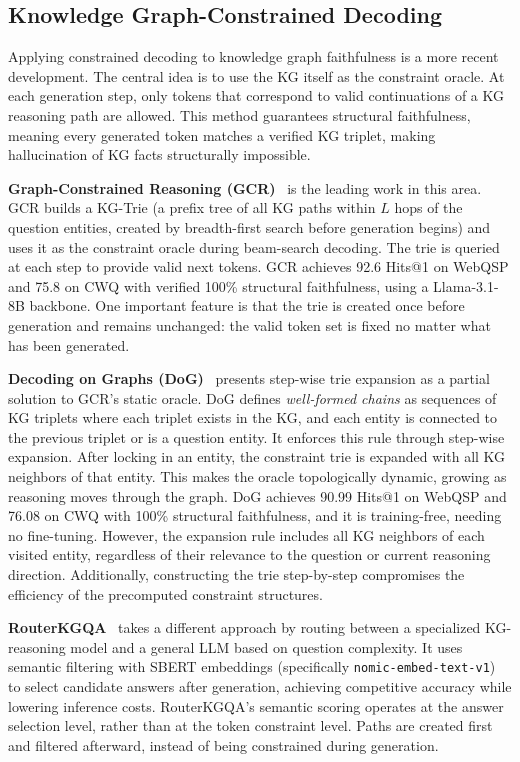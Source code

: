 \subsection{Knowledge Graph-Constrained Decoding}

Applying constrained decoding to knowledge graph faithfulness is a more recent development. The central idea is to use the KG itself as the constraint oracle. At each generation step, only tokens that correspond to valid continuations of a KG reasoning path are allowed. This method guarantees structural faithfulness, meaning every generated token matches a verified KG triplet, making hallucination of KG facts structurally impossible.

\textbf{Graph-Constrained Reasoning (GCR)}~\citep{luo2025-graph-constrained-reasoning} is the leading work in this area. GCR builds a KG-Trie (a prefix tree of all KG paths within $L$ hops of the question entities, created by breadth-first search before generation begins) and uses it as the constraint oracle during beam-search decoding. The trie is queried at each step to provide valid next tokens. GCR achieves 92.6 Hits@1 on WebQSP and 75.8 on CWQ with verified 100\% structural faithfulness, using a Llama-3.1-8B backbone. One important feature is that the trie is created once before generation and remains unchanged: the valid token set is fixed no matter what has been generated.

\textbf{Decoding on Graphs (DoG)}~\citep{li2024-decoding-on-graphs} presents step-wise trie expansion as a partial solution to GCR's static oracle. DoG defines \textit{well-formed chains} as sequences of KG triplets where each triplet exists in the KG, and each entity is connected to the previous triplet or is a question entity. It enforces this rule through step-wise expansion. After locking in an entity, the constraint trie is expanded with all KG neighbors of that entity. This makes the oracle topologically dynamic, growing as reasoning moves through the graph. DoG achieves 90.99 Hits@1 on WebQSP and 76.08 on CWQ with 100\% structural faithfulness, and it is training-free, needing no fine-tuning. However, the expansion rule includes all KG neighbors of each visited entity, regardless of their relevance to the question or current reasoning direction. Additionally, constructing the trie step-by-step compromises the efficiency of the precomputed constraint structures.

\textbf{RouterKGQA}~\citep{yuan2026routerkgqa} takes a different approach by routing between a specialized KG-reasoning model and a general LLM based on question complexity. It uses semantic filtering with SBERT embeddings (specifically \texttt{nomic-embed-text-v1}) to select candidate answers after generation, achieving competitive accuracy while lowering inference costs. RouterKGQA's semantic scoring operates at the answer selection level, rather than at the token constraint level. Paths are created first and filtered afterward, instead of being constrained during generation.

